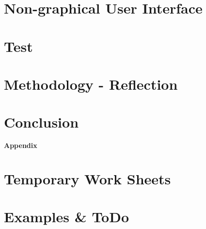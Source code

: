 \chapter{Non-graphical User Interface}
\label{chap:tactileInterface}


\chapter{Test}
\label{chap:test}


\chapter{Methodology - Reflection}
\label{chap:reflectionMethodology}


\chapter{Conclusion}
\label{chap:conclusion}




\appendix	%

\clearforchapter
\begin{vplace}[0.7]
\begin{center}
\Huge \textbf{Appendix}
\end{center}
\end{vplace}



\chapter{Temporary Work Sheets}
\label{chap:temp}









\chapter{Examples \& ToDo}

\clearpage
\listoftodos
